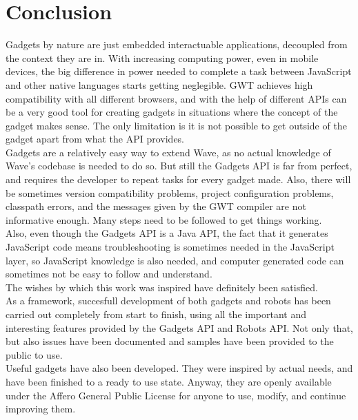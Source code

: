 \newpage
\section{Conclusion}

Gadgets by nature are just embedded interactuable applications, decoupled from the context they are in. With increasing computing power, even in mobile devices, the big difference \cite{ref:javascript_slow} in power needed to complete a task between JavaScript and other native languages starts getting neglegible. GWT achieves high compatibility with all different browsers, and with the help of different APIs can be a very good tool for creating gadgets in situations where the concept of the gadget makes sense. The only limitation is it is not possible to get outside of the gadget apart from what the API provides.\\[.2cm]
Gadgets are a relatively easy way to extend Wave, as no actual knowledge of Wave's codebase is needed to do so. But still the Gadgets API is far from perfect, and requires the developer to repeat tasks for every gadget made. Also, there will be sometimes version compatibility problems, project configuration problems, classpath errors, and the messages given by the GWT compiler are not informative enough. Many steps need to be followed to get things working.\\[.2cm]
Also, even though the Gadgets API is a Java API, the fact that it generates JavaScript code means troubleshooting is sometimes needed in the JavaScript layer, so JavaScript knowledge is also needed, and computer generated code can sometimes not be easy to follow and understand.\\[.2cm]
The wishes by which this work was inspired have definitely been satisfied.\\[.2cm]
As a framework, succesfull development of both gadgets and robots has been carried out completely from start to finish, using all the important and interesting features provided by the Gadgets API and Robots API. Not only that, but also issues have been documented and samples have been provided to the public to use.\\[.2cm]
Useful gadgets have also been developed. They were inspired by actual needs, and have been finished to a ready to use state. Anyway, they are openly available under the Affero General Public License\cite{ref:agpl} for anyone to use, modify, and continue improving them.

